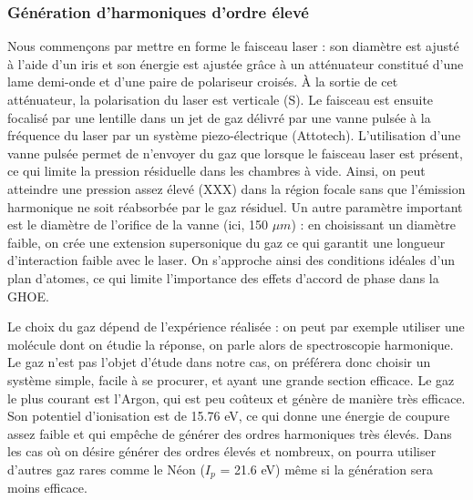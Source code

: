 \subsubsection{Génération d'harmoniques d'ordre élevé}
Nous commençons par mettre en forme le faisceau laser : son diamètre est ajusté à l'aide d'un iris et son énergie est ajustée grâce à un atténuateur constitué d'une lame demi-onde et d'une paire de polariseur croisés. \`{A} la sortie de cet atténuateur, la polarisation du laser est verticale (S). Le faisceau est ensuite focalisé par une lentille dans un jet de gaz délivré par une vanne pulsée à la fréquence du laser par un système piezo-électrique (Attotech). L'utilisation d'une vanne pulsée permet de n'envoyer du gaz que lorsque le faisceau laser est présent, ce qui limite la pression résiduelle dans les chambres à vide. Ainsi, on peut atteindre une pression assez élevé (XXX) dans la région focale sans que l'émission harmonique ne soit réabsorbée par le gaz résiduel. Un autre paramètre important est le diamètre de l'orifice de la vanne (ici, 150 $\mu m$) : en choisissant un diamètre faible, on crée une extension supersonique du gaz ce qui garantit une longueur d'interaction faible avec le laser. On s'approche ainsi des conditions idéales d'un plan d'atomes, ce qui limite l'importance des effets d'accord de phase dans la GHOE. \par
Le choix du gaz dépend de l'expérience réalisée : on peut par exemple utiliser une molécule dont on étudie la réponse, on parle alors de spectroscopie harmonique. Le gaz n'est pas l'objet d'étude dans notre cas, on préférera donc choisir un système simple, facile à se procurer, et ayant une grande section efficace. Le gaz le plus courant est l'Argon, qui est peu coûteux et génère de manière très efficace. Son potentiel d'ionisation est de 15.76 eV, ce qui donne une énergie de coupure assez faible et qui empêche de générer des ordres harmoniques très élevés. Dans les cas où on désire générer des ordres élevés et nombreux, on pourra utiliser d'autres gaz rares comme le Néon ($I_p$ = 21.6 eV) même si la génération sera moins efficace.

